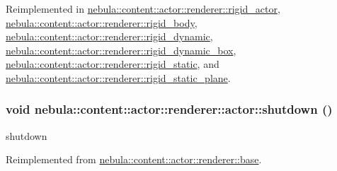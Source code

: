 Reimplemented in \hyperlink{classnebula_1_1content_1_1actor_1_1renderer_1_1rigid__actor_a099097e3dd6511e0ae3a25a9f092efcf}{nebula::content::actor::renderer::rigid\_\-actor}, \hyperlink{classnebula_1_1content_1_1actor_1_1renderer_1_1rigid__body_ae3a3c72c7306b9ee55eb75abf36e7476}{nebula::content::actor::renderer::rigid\_\-body}, \hyperlink{classnebula_1_1content_1_1actor_1_1renderer_1_1rigid__dynamic_a80f2984c2dadef15360b53cf3d05286c}{nebula::content::actor::renderer::rigid\_\-dynamic}, \hyperlink{classnebula_1_1content_1_1actor_1_1renderer_1_1rigid__dynamic__box_af1ee2316e0a03674fbbaea64cf1c4a8b}{nebula::content::actor::renderer::rigid\_\-dynamic\_\-box}, \hyperlink{classnebula_1_1content_1_1actor_1_1renderer_1_1rigid__static_a37251ebb4a8c07abdff018bc8d1537fb}{nebula::content::actor::renderer::rigid\_\-static}, and \hyperlink{classnebula_1_1content_1_1actor_1_1renderer_1_1rigid__static__plane_a77394d3465965bdb4bc7aeb7a0290757}{nebula::content::actor::renderer::rigid\_\-static\_\-plane}.\hypertarget{classnebula_1_1content_1_1actor_1_1renderer_1_1actor_a3c051be72600dbc471e16e3c6ff53c52}{
\subsubsection[{shutdown}]{\setlength{\rightskip}{0pt plus 5cm}void nebula::content::actor::renderer::actor::shutdown ()}}
\label{classnebula_1_1content_1_1actor_1_1renderer_1_1actor_a3c051be72600dbc471e16e3c6ff53c52}


shutdown 

Reimplemented from \hyperlink{classnebula_1_1content_1_1actor_1_1renderer_1_1base_abb61c46f573309a2f96a7fe6b95f5cd3}{nebula::content::actor::renderer::base}.

